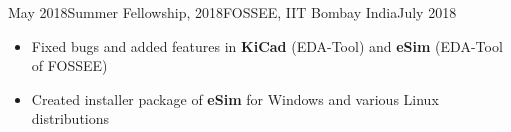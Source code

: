 
\begin{experiences}
  \experience
    {May 2018}{Summer Fellowship, 2018}{FOSSEE, IIT Bombay}
    {India\hfill {}}{July 2018} 
    {
        \begin{itemize}
            \item Fixed bugs and added features in \textbf{KiCad} (EDA-Tool) and \textbf{eSim} (EDA-Tool of FOSSEE)
            \item Created installer package of \textbf{eSim} for Windows and various Linux distributions
        \end{itemize}
    }
\end{experiences}

